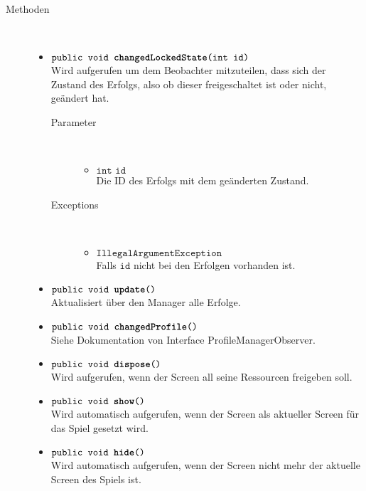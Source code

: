 \begin{description}
\item[Methoden] \hfill \\
	\vspace{-.8cm}
	\begin{itemize}
		\item $\texttt{public void \textbf{changedLockedState}(int id)}$ \\ Wird aufgerufen um dem Beobachter mitzuteilen, dass sich der Zustand des Erfolgs, also ob dieser freigeschaltet ist oder nicht, geändert hat.
			\begin{description}
				\item[Parameter] \hfill \\
				\vspace{-.8cm}
				\begin{itemize}
					\item $\texttt{int id}$ \\ Die ID des Erfolgs mit dem geänderten Zustand.
				\end{itemize}
				\item[Exceptions] \hfill \\
				\vspace{-.8cm}
				\begin{itemize}
					\item $\texttt{IllegalArgumentException}$ \\ Falls $\texttt{id}$ nicht bei den Erfolgen vorhanden ist.
				\end{itemize}
			\end{description}	
			
		\item $\texttt{public void \textbf{update}()}$ \\ Aktualisiert über den Manager alle Erfolge.
		
		\item $\texttt{public void \textbf{changedProfile}()}$ \\ Siehe Dokumentation von Interface ProfileManagerObserver.
	
		\item $\texttt{public void \textbf{dispose}()}$ \\ Wird aufgerufen, wenn der Screen all seine Ressourcen freigeben soll.
		
		\item $\texttt{public void \textbf{show}()}$ \\ Wird automatisch aufgerufen, wenn der Screen als aktueller Screen für das Spiel gesetzt wird.
	
		\item $\texttt{public void \textbf{hide}()}$ \\ Wird automatisch aufgerufen, wenn der Screen nicht mehr der aktuelle Screen des Spiels ist.
	

\end{itemize}
\end{description}
